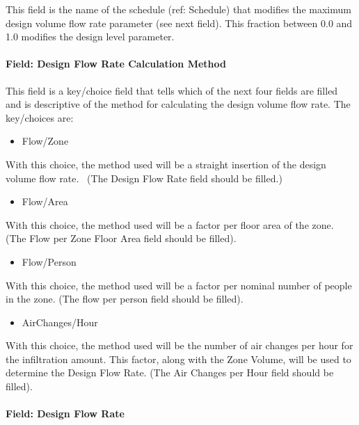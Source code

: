 This field is the name of the schedule (ref: Schedule) that modifies the maximum design volume flow rate parameter (see next field). This fraction between 0.0 and 1.0 modifies the design level parameter.

\paragraph{Field: Design Flow Rate Calculation Method}\label{field-design-flow-rate-calculation-method-3}

This field is a key/choice field that tells which of the next four fields are filled and is descriptive of the method for calculating the design volume flow rate. The key/choices are:

\begin{itemize}
\tightlist
\item
  Flow/Zone
\end{itemize}

With this choice, the method used will be a straight insertion of the design volume flow rate.~ (The Design Flow Rate field should be filled.)

\begin{itemize}
\tightlist
\item
  Flow/Area
\end{itemize}

With this choice, the method used will be a factor per floor area of the zone. (The Flow per Zone Floor Area field should be filled).

\begin{itemize}
\tightlist
\item
  Flow/Person
\end{itemize}

With this choice, the method used will be a factor per nominal number of people in the zone. (The flow per person field should be filled).

\begin{itemize}
\tightlist
\item
  AirChanges/Hour
\end{itemize}

With this choice, the method used will be the number of air changes per hour for the infiltration amount. This factor, along with the Zone Volume, will be used to determine the Design Flow Rate. (The Air Changes per Hour field should be filled).

\paragraph{Field: Design Flow Rate}\label{field-design-flow-rate-3}

